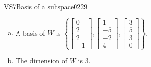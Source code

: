 \begin{exercise}{VS7}{Basis of a subspace}{0229}
\begin{exerciseAnswer}
 

\begin{enumerate}[(a)]
\item 

A basis of \(W\) is \(\left\{ \left[\begin{array}{c}
0 \\
2 \\
2 \\
-1
\end{array}\right] , \left[\begin{array}{c}
1 \\
-5 \\
-2 \\
4
\end{array}\right] , \left[\begin{array}{c}
3 \\
5 \\
3 \\
0
\end{array}\right] \right\}\).


\item 

The dimension of \(W\) is \(3\).


\end{enumerate}

     \end{exerciseAnswer}
 \end{exercise}



